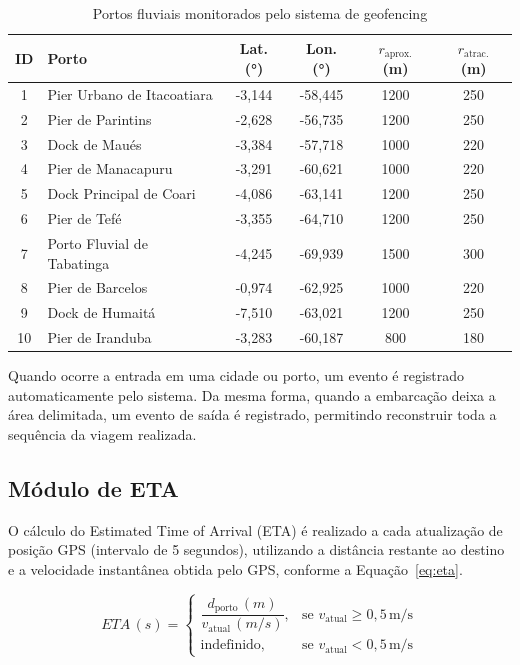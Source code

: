 \documentclass[12pt]{article}
\begin{document}
\begin{table}[H]
\caption{Portos fluviais monitorados pelo sistema de geofencing}
\label{tab:portos}
\centering
\renewcommand{\arraystretch}{1.2}
\begin{tabular}{clcccc}
\toprule
\textbf{ID} & \textbf{Porto} & \textbf{Lat. (°)} & \textbf{Lon. (°)} & \textbf{$r_{\text{aprox.}}$ (m)} & \textbf{$r_{\text{atrac.}}$ (m)} \\
\midrule
1 & Pier Urbano de Itacoatiara & -3,144 & -58,445 & 1200 & 250 \\
2 & Pier de Parintins           & -2,628 & -56,735 & 1200 & 250 \\
3 & Dock de Maués               & -3,384 & -57,718 & 1000 & 220 \\
4 & Pier de Manacapuru          & -3,291 & -60,621 & 1000 & 220 \\
5 & Dock Principal de Coari     & -4,086 & -63,141 & 1200 & 250 \\
6 & Pier de Tefé                & -3,355 & -64,710 & 1200 & 250 \\
7 & Porto Fluvial de Tabatinga  & -4,245 & -69,939 & 1500 & 300 \\
8 & Pier de Barcelos            & -0,974 & -62,925 & 1000 & 220 \\
9 & Dock de Humaitá             & -7,510 & -63,021 & 1200 & 250 \\
10 & Pier de Iranduba           & -3,283 & -60,187 &  800 & 180 \\
\bottomrule
\end{tabular}
\end{table}

Quando ocorre a entrada em uma cidade ou porto, um evento é registrado automaticamente pelo sistema. Da mesma forma, quando a embarcação deixa a área delimitada, um evento de saída é registrado, permitindo reconstruir toda a sequência da viagem realizada.

\subsection{Módulo de ETA}
O cálculo do Estimated Time of Arrival (ETA) é realizado a cada atualização de posição GPS (intervalo de 5 segundos), utilizando a distância restante ao destino e a velocidade instantânea obtida pelo GPS, conforme a Equação~\ref{eq:eta}.

\begin{equation}
\label{eq:eta}
ETA\,(s) =
\begin{cases}
\dfrac{d_{\text{porto}}\,(m)}{v_{\text{atual}}\,(m/s)}, & \text{se } v_{\text{atual}} \geq 0{,}5\,\text{m/s} \\[8pt]
\text{indefinido}, & \text{se } v_{\text{atual}} < 0{,}5\,\text{m/s}
\end{cases}
\end{equation}
\end{document}
